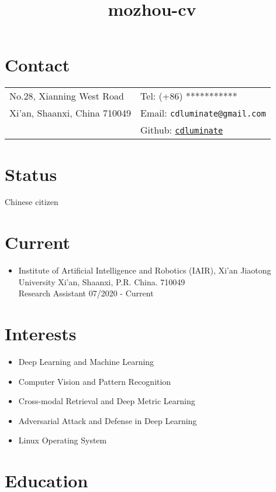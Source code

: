 \documentclass[margin,line,pifont,palatino,courier]{res}
\begin{document}
\title{mozhou-cv}
\begin{resume}

\section{\sc Contact}

\vspace{.05in}
\begin{tabular}{@{}p{2.2in}p{2.2in}}
No.28, Xianning West Road & Tel: (+86) *********** \\
Xi'an, Shaanxi, China 710049  & Email: \verb+cdluminate@gmail.com+\\
			& Github: \href{https://github.com/cdluminate}{\tt cdluminate}\\
\end{tabular}

\section{\sc Status}
Chinese citizen

\section{\sc Current}
\begin{itemize}[leftmargin=*]
	\item Institute of
		Artificial Intelligence and Robotics (IAIR), Xi'an Jiaotong University
		\flushright Xi'an, Shaanxi, P.R. China. 710049\\
		Research Assistant \hfill 07/2020 - Current
\end{itemize}

\section{\sc Interests}
\begin{itemize}[noitemsep, leftmargin=*]
	\item Deep Learning and Machine Learning
    \item Computer Vision and Pattern Recognition
	\item Cross-modal Retrieval and Deep Metric Learning 
	\item Adversarial Attack and Defense in Deep Learning
	\item Linux Operating System
\end{itemize}
 
\section{\sc Education}


\end{resume}
\end{document}
